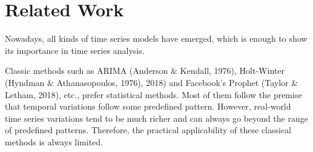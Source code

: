 \section{Related Work}
\label{sec:Related_Work}





Nowadays, all kinds of time series models have emerged, which is enough to show its importance in time series analysis.

Classic methods such as ARIMA (Anderson \& Kendall, 1976), Holt-Winter (Hyndman \& Athanasopoulos, 1976), 2018) and Facebook's Prophet (Taylor \& Letham, 2018), etc., prefer statistical methods. Most of them follow the premise that temporal variations follow some predefined pattern. However, real-world time series variations tend to be much richer and can always go beyond the range of predefined patterns. Therefore, the practical applicability of these classical methods is always limited.


